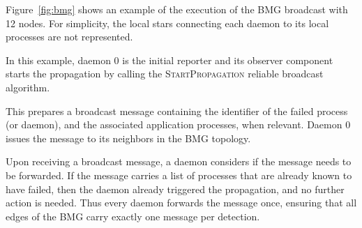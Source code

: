 \documentclass[5p,times,twocolumn]{elsarticle}
\begin{document}
Figure~\ref{fig:bmg} shows an example of the execution of the BMG broadcast
with 12 nodes. For simplicity, the local stars connecting each daemon to
its local processes are not represented.

\begin{compactenum}
 \item In this example, daemon 0 is the initial reporter and its observer component starts the propagation by calling the \textsc{StartPropagation} reliable broadcast algorithm.
 \item This prepares a broadcast message containing the identifier of the
 failed process (or daemon), and the associated application processes, when relevant.
 Daemon 0 issues the message to its neighbors in the BMG topology.
 \item Upon receiving a broadcast message, a daemon considers if the message needs
 to be forwarded. If the message carries a list of processes that are already known to
 have failed, then the daemon already triggered the propagation, and no further
 action is needed. Thus every daemon forwards the message once, ensuring that
 all edges of the BMG carry exactly one message per detection.
\end{compactenum}
\end{document}
